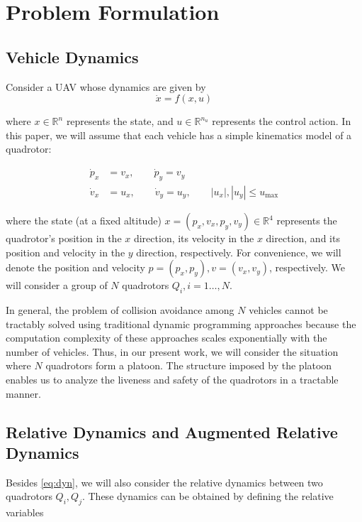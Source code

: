 \section{Problem Formulation \label{sec:formulation}}
\subsection{Vehicle Dynamics}
Consider a UAV whose dynamics are given by
\begin{equation}
\dot{x} = f(x,u)
\end{equation}

\noindent where $x\in\mathbb{R}^n$ represents the state, and $u\in\mathbb{R}^{n_u}$ represents the control action. In this paper, we will assume that each vehicle has a simple kinematics model of a quadrotor:

\begin{equation} \label{eq:dyn}
\begin{aligned}
\dot{p}_x &= v_x, \qquad \dot{p}_y = v_y  \\
\dot{v}_x &= u_x, \qquad \dot{v}_y = u_y, \qquad |u_x|,|u_y| \le u_\text{max}
\end{aligned}
\end{equation}

\noindent where the state (at a fixed altitude) $x=(p_x, v_x, p_y, v_y)\in\mathbb{R}^4$ represents the quadrotor's position in the $x$ direction, its velocity in the $x$ direction, and its position and velocity in the $y$ direction, respectively. For convenience, we will denote the position and velocity $p=(p_x, p_y),v=(v_x,v_y)$, respectively. We will consider a group of $N$ quadrotors $Q_i, i=1\ldots,N$.

In general, the problem of collision avoidance among $N$ vehicles cannot be tractably solved using traditional dynamic programming approaches because the computation complexity of these approaches scales exponentially with the number of vehicles. Thus, in our present work, we will consider the situation where $N$ quadrotors form a platoon. The structure imposed by the platoon enables us to analyze the liveness and safety of the quadrotors in a tractable manner.

\subsection{Relative Dynamics and Augmented Relative Dynamics}
Besides \eqref{eq:dyn}, we will also consider the relative dynamics between two quadrotors $Q_i,Q_j$. These dynamics can be obtained by defining the relative variables

